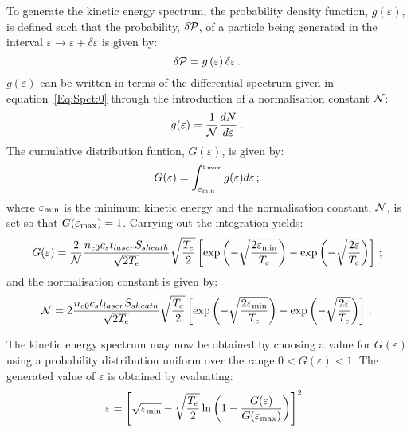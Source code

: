 To generate the kinetic energy spectrum, the probability density
function, $g(\varepsilon)$, is defined such that the probability,
$\delta {\cal P}$, of a particle being generated in the interval
$\varepsilon \rightarrow \varepsilon + \delta \varepsilon$ is given
by:
\begin{equation}
   \delta {\cal P} = g \left( \varepsilon \right) \delta \varepsilon \, .
\end{equation}
$g(\varepsilon)$ can be written in terms of the differential spectrum
given in equation~\ref{Eq:Spct:0} through the introduction of a
normalisation constant ${\cal N}$:
\begin{equation}
  g(\varepsilon) = \frac{1}{\cal N} \frac{dN}{d\varepsilon} \, .
\end{equation}
The cumulative distribution funtion, $G(\varepsilon)$, is given by:
\begin{equation}
  G(\varepsilon) = \int_{\varepsilon_{\rm min}}^{\varepsilon_{\rm max}} g(\varepsilon)
                                               d\varepsilon \,;
\end{equation}
where $\varepsilon_{\rm min}$ is the minimum kinetic energy and the
normalisation constant, ${\cal N}$, is set so that
$G(\varepsilon_{\rm max}) = 1$.
Carrying out the integration yields:
\begin{equation}
  G(\varepsilon) = \frac{2}{\cal N}
                   \frac{n_{e0} c_{s} t_{laser} S_{sheath}} {\sqrt{2T_{e}}}
                   \sqrt{\frac{T_{e}}{2}}
                   \left[
                         \exp\left(
                                   -\sqrt{\frac{2\varepsilon_{\rm min}}{T_{e}}}
                             \right) -
                         \exp\left(
                                   -\sqrt{\frac{2\varepsilon}{T_{e}}}
                             \right)
                   \right] \, ;
\end{equation}
and the normalisation constant is given by:
\begin{equation}
  {\cal N} = 2
             \frac{n_{e0} c_{s} t_{laser} S_{sheath}} {\sqrt{2T_{e}}}
             \sqrt{\frac{T_{e}}{2}}
             \left[
                   \exp\left(
                             -\sqrt{\frac{2\varepsilon_{\rm min}}{T_{e}}}
                             \right) -
                         \exp\left(
                                   -\sqrt{\frac{2\varepsilon}{T_{e}}}
                              \right)
             \right] \, .
\end{equation}

The kinetic energy spectrum may now be obtained by choosing a value
for $G(\varepsilon)$ using a probability distribution uniform over the
range $0 < G(\varepsilon) < 1$.
The generated value of $\varepsilon$ is obtained by evaluating:
\begin{equation}
  \varepsilon = \left[
                      \sqrt{\varepsilon_{\rm min}} -
                      \sqrt{\frac{T_e}{2}} \ln \left(
                     1 - \frac{G(\varepsilon)}{G(\varepsilon_{\rm max})}
                                               \right)
                \right]^2 \, .
\end{equation}

